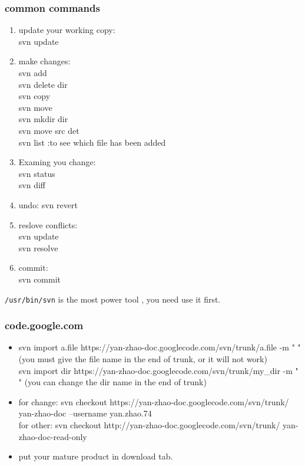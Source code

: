 \documentclass[a4paper,12pt,twoside]{book}
\begin{document}
\begin{CJK*}{UTF8}{song}
\subsubsection{common commands}
\begin{enumerate}
 \item update your working copy: \\
   svn update
 \item make changes: \\
    svn add \\
    svn delete dir \\
    svn copy \\
    svn move \\
    svn mkdir dir \\
    svn move src det \\
    svn list :to see which file has been added \\

\item Examing you change: \\
    svn status \\
    svn diff \\
\item undo:
    svn revert \\
\item reslove conflicts: \\
    svn update \\
    svn resolve \\
\item commit: \\
    svn commit \\
\end{enumerate}

\verb=/usr/bin/svn= is the most power tool , you need use it first.

\subsubsection{code.google.com}
\begin{itemize}
    \item svn import  a.file  https://yan-zhao-doc.googlecode.com/svn/trunk/a.file  -m " "
       (you must give the file name in the end of trunk, or it will not work)  \\
	svn import  dir  https://yan-zhao-doc.googlecode.com/svn/trunk/my\_dir  -m " "
	(you can change the dir name  in the end of trunk)
    \item for change: svn checkout https://yan-zhao-doc.googlecode.com/svn/trunk/ yan-zhao-doc --username yan.zhao.74 \\
for other: svn checkout http://yan-zhao-doc.googlecode.com/svn/trunk/ yan-zhao-doc-read-only
    \item  put your mature product in download tab.
\end{itemize}



\end{CJK*}
\end{document}
